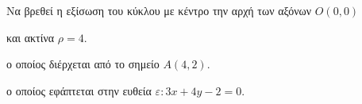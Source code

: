 Να βρεθεί η εξίσωση του κύκλου με κέντρο την αρχή των αξόνων $ O(0,0) $ 
\begin{alist}
\item και ακτίνα $ \rho=4 $.
\item ο οποίος διέρχεται από το σημείο $ A(4,2) $.
\item ο οποίος εφάπτεται στην ευθεία $ \varepsilon : 3x+4y-2=0 $.
\end{alist}
